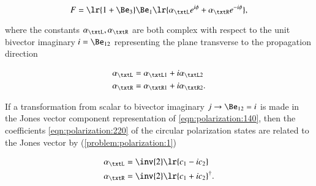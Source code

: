 \begin{dmath}\label{eqn:polarization:200}
F = \lr{ 1 + \Be_3 } \Be_1 \lr{ \alpha_\txtL e^{i\phi} + \alpha_\txtR e^{-i\phi} },
\end{dmath}

where the constants \( \alpha_\txtL, \alpha_\txtR \) are both complex with respect to the unit bivector imaginary \( i = \Be_{12} \) representing the plane transverse to the propagation direction

\begin{dmath}\label{eqn:polarization:220}
\begin{aligned}
\alpha_\txtL &= \alpha_{\txtL 1} + i \alpha_{\txtL 2} \\
\alpha_\txtR &= \alpha_{\txtR 1} + i \alpha_{\txtR 2}.
\end{aligned}
\end{dmath}

If a transformation from scalar to bivector imaginary \( j \rightarrow \Be_{12} = i \) is made in the Jones vector component representation of \cref{eqn:polarization:140},
then
the coefficients \cref{eqn:polarization:220} of the circular polarization states are related to the Jones vector by (\cref{problem:polarization:1})

\begin{dmath}\label{eqn:polarization:260}
\begin{aligned}
\alpha_\txtL &= \inv{2}\lr{ c_1 - i c_2 } \\
\alpha_\txtR &= \inv{2}\lr{ c_1 + i c_2 }^\dagger.
\end{aligned}
\end{dmath}

